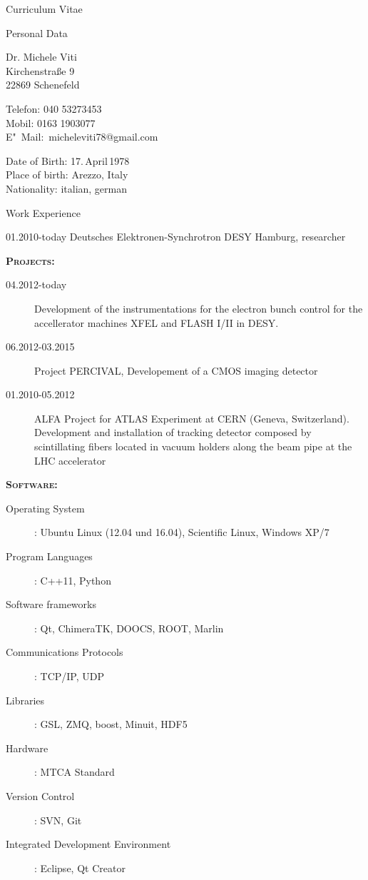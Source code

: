\documentclass[11pt,a4paper]{scrartcl}
\begin{document}
\begin{cv}{Curriculum Vitae}
\begin{cvlist}{Personal Data}
\item Dr. Michele Viti\\
Kirchenstra{\ss}e 9\\
22869 Schenefeld
\item Telefon: 040 53273453\\
Mobil: 0163 1903077\\
E"~Mail:~micheleviti78@gmail.com
\item Date of Birth: 17.\,April\,1978\\
Place of birth: Arezzo, Italy\\
Nationality: italian, german
\end{cvlist}

\begin{cvlist}{Work Experience}

\item[01.2010-today] Deutsches Elektronen-Synchrotron DESY Hamburg, researcher

{\scshape {\bfseries Projects:}}
\begin{description}
\item[04.2012-today] Development of the instrumentations for the electron bunch
control for the accellerator machines XFEL and FLASH I/II in DESY.
\item[06.2012-03.2015]Project PERCIVAL, Developement of a CMOS imaging
detector
\item[01.2010-05.2012]ALFA Project for ATLAS Experiment at CERN (Geneva,
Switzerland). Development and installation of tracking detector composed by
scintillating fibers  located in vacuum holders along the beam pipe at the LHC
accelerator
\end{description}
{\scshape {\bfseries Software:}}
\begin{description}
\item[Operating System] : Ubuntu Linux (12.04 und 16.04), Scientific Linux,
Windows XP/7
\item[Program Languages] : C++11, Python
\item[Software frameworks] : Qt, ChimeraTK, DOOCS, ROOT, Marlin
\item[Communications Protocols] : TCP/IP, UDP
\item[Libraries] : GSL, ZMQ, boost, Minuit, HDF5
\item[Hardware] : MTCA Standard
\item[Version Control] : SVN, Git
\item[Integrated Development Environment] : Eclipse, Qt Creator
\end{description}


\end{cvlist}
\end{cv}
\end{document}
